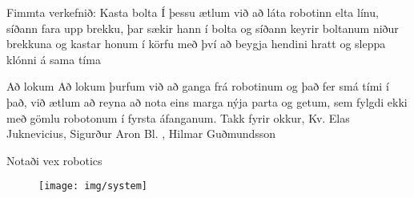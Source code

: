 Fimmta verkefnið:
Kasta bolta                                          
Í þessu ætlum við að láta robotinn elta línu, síðann fara upp brekku, þar sækir hann í bolta og síðann keyrir boltanum niður brekkuna og kastar honum í körfu með því að beygja hendini hratt og sleppa klónni á sama tíma

Að lokum
Að lokum þurfum við að ganga frá robotinum og það fer smá tími í það, við ætlum að reyna að nota eins marga nýja parta og getum, sem fylgdi ekki með gömlu robotonum í fyrsta áfanganum. 
Takk fyrir okkur, 
Kv.
Elas Juknevicius, Sigurður Aron Bl. , Hilmar Guðmundsson



Notaði vex robotics\cite{vexRobot}
\begin{figure}[h]
\texttt{[image: img/system]}
\end{figure}